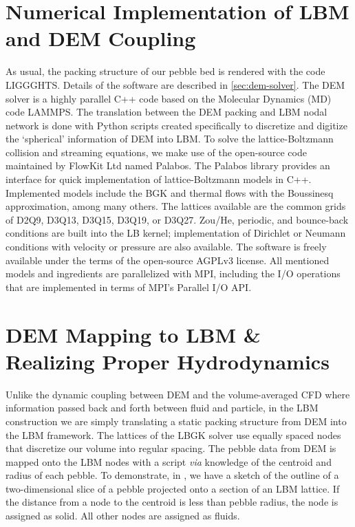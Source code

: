 

\section{Numerical Implementation of LBM and DEM Coupling}\label{sec:lbm-solver}

As usual, the packing structure of our pebble bed is rendered with the code LIGGGHTS. Details of the software are described in \cref{sec:dem-solver}. The DEM solver is a highly parallel C++ code based on the Molecular Dynamics (MD) code LAMMPS.\cite{Plimpton1995} The translation between the DEM packing and LBM nodal network is done with Python scripts created specifically to discretize and digitize the `spherical' information of DEM into LBM. To solve the lattice-Boltzmann collision and streaming equations, we make use of the open-source code maintained by FlowKit Ltd named Palabos.\cite{Flow} The Palabos library provides an interface for quick implementation of lattice-Boltzmann models in C++. Implemented models include the BGK and thermal flows with the Boussinesq approximation, among many others. The lattices available are the common grids of D2Q9, D3Q13, D3Q15, D3Q19, or D3Q27. Zou/He, periodic, and bounce-back conditions are built into the LB kernel; implementation of Dirichlet or Neumann conditions with velocity or pressure are also available. The software is freely available under the terms of the open-source AGPLv3 license.\cite{FreeSoftwareFoundationInc.2007} All mentioned models and ingredients are parallelized with MPI, including the I/O operations that are implemented in terms of MPI’s Parallel I/O API.









\section{DEM Mapping to LBM \& Realizing Proper Hydrodynamics}
Unlike the dynamic coupling between DEM and the volume-averaged CFD where information passed back and forth between fluid and particle, in the LBM construction we are simply translating a static packing structure from DEM into the LBM framework. The lattices of the LBGK solver use equally spaced nodes that discretize our volume into regular spacing. The pebble data from DEM is mapped onto the LBM nodes with a script \textit{via} knowledge of the centroid and radius of each pebble. To demonstrate, in , we have a sketch of the outline of a two-dimensional slice of a pebble projected onto a section of an LBM lattice. If the distance from a node to the centroid is less than pebble radius, the node is assigned as solid. All other nodes are assigned as fluids.


